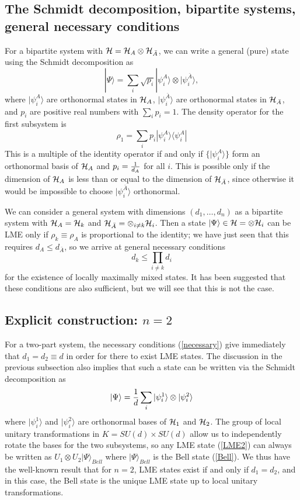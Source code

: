 \documentclass[12pt]{article}
\theoremstyle{definition}
\newcommand{\be}{\begin{equation}}
\newcommand{\ee}{\end{equation}}
\begin{document}
\subsection{The Schmidt decomposition, bipartite systems, general necessary conditions}

For a bipartite system with ${\cal H} = {\cal H}_A \otimes {\cal H}_{\bar{A}}$, we can write a general (pure) state using the Schmidt decomposition as
\be
|\Psi \rangle = \sum_i \sqrt{p_i} |\psi_i^A \rangle \otimes |\psi_i^{\bar{A}} \rangle,
\ee
where $|\psi_i^A\rangle$ are orthonormal states in ${\cal H}_A$, $|\psi_i^{\bar{A}} \rangle$ are orthonormal states in ${\cal H}_{\bar{A}}$, and $p_i$ are positive real numbers with $\sum_i p_i = 1$. The density operator for the first subsystem is
\be
\rho_1 = \sum_i p_i |\psi_i^A \rangle \langle \psi_i^A|
\ee
This is a multiple of the identity operator if and only if $\{|\psi_i^A \rangle\}$ form an orthonormal basis of ${\cal H}_A$ and $p_i = {1 \over d_A}$ for all $i$. This is possible only if the dimension of ${\cal H}_A$ is less than or equal to the dimension of ${\cal H}_{\bar{A}}$, since otherwise it would be impossible to choose $|\psi_i^{\bar{A}} \rangle$ orthonormal.

We can consider a general system with dimensions $(d_1,\dots, d_n)$ as a bipartite system with ${\cal H}_A = {\cal H}_k$ and ${\cal H}_{\bar{A}} = \otimes_{i \ne k} {\cal H}_i$. Then a state $|\Psi \rangle \in {\cal H} = \otimes {\cal H}_i$ can be LME only if $\rho_k \equiv \rho_A$ is proportional to the identity; we have just seen that this requires $d_A \le d_{\bar{A}}$, so we arrive at general necessary conditions
\be
\label{necessary}
d_k \le \prod_{i \ne k} d_i
\ee
for the existence of locally maximally mixed states. It has been suggested that these conditions are also sufficient, but we will see that this is not the case.

\subsection{Explicit construction: $n=2$}

For a two-part system, the necessary conditions (\ref{necessary}) give immediately that $d_1 = d_2 \equiv d$ in order for there to exist LME states. The discussion in the previous subsection also implies that such a state can be written via the Schmidt decomposition as
\be
\label{LME2}
|\Psi \rangle = {1 \over d} \sum_i |\psi_i^1 \rangle \otimes |\psi_i^2 \rangle
\ee
where $|\psi_i^1 \rangle$ and $|\psi_i^2 \rangle$ are orthonormal bases of ${\cal H}_1$ and ${\cal H}_2$. The group of local  unitary transformations in $K = SU(d) \times SU(d)$ allow us to independently rotate the bases for the two subsystems, so any LME state (\ref{LME2}) can always be written as $U_1 \otimes U_2 |\Psi \rangle_{Bell}$ where $|\Psi \rangle_{Bell}$ is the Bell state (\ref{Bell}). We thus have the well-known result that for $n=2$, LME states exist if and only if $d_1 = d_2$, and in this case, the Bell state is the unique LME state up to local unitary transformations.
\end{document}
